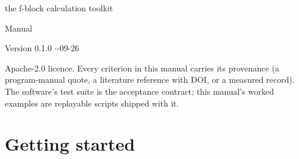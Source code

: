 \documentclass[11pt,a4paper,oneside,numbers=noenddot,listof=totoc]{scrreprt}
\begin{document}
\begin{titlepage}
  \centering
  \vspace*{3cm}
  {\sffamily\Huge\bfseries \fbk\par}
  \vspace{0.6cm}
  {\sffamily\Large the f-block calculation toolkit\par}
  \vspace{0.3cm}
  {\sffamily\large Manual\par}
  \vspace{1.5cm}
  {\large Version 0.1.0 \quad$\cdot$-09-26\par}
  \vfill
  {\small Apache-2.0 licence. Every criterion in this manual carries its
   provenance (a program-manual quote, a literature reference with DOI, or a
   measured record). The software's test suite is the acceptance contract; this
   manual's worked examples are replayable scripts shipped with it.\par}
\end{titlepage}




\tableofcontents

\clearpage
{}

\part{Getting started}




\end{document}
